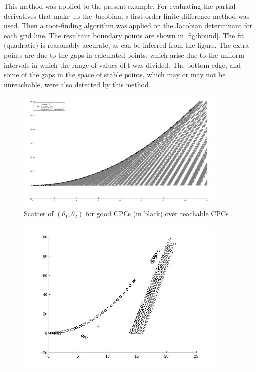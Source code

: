 \begin{multicols}{2}
This method was applied to the present example. For evaluating the partial 
derivatives that make up the Jacobian, a first-order finite difference 
method was used. Then a root-finding algorithm was applied on the Jacobian 
determinant for each grid line. The resultant boundary points are shown in 
\autoref{fig:bound}. The fit (quadratic) is reasonably accurate, as can be 
inferred from the figure. The extra points are due to the gaps in 
calculated points, which arise due to the uniform intervals in which 
the range of values of \gls{t} was divided. The bottom edge, and some 
of the gaps in the space of stable points, which may or may not be 
unreachable, were also detected by this method.
%
\begin{figure}
\centering
\includegraphics[width=0.9\textwidth]{bound.jpg}
\caption{Scatter of $(\theta_1, \theta_2)$ for good CPCs (in black) over reachable CPCs}
\label{fig:theta}
\end{figure}
%
\reversemarginpar
\begin{figure}
\centering
\includegraphics[width=0.9\textwidth]{allbound.jpg}

\end{figure}
\end{multicols}
